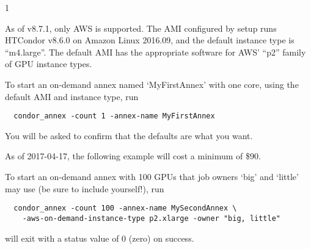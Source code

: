 \begin{ManPage}{\label{man-condor-annex}}{1}
\GenRem

As of v8.7.1, only AWS is supported.  The AMI configured by setup runs
HTCondor v8.6.0 on Amazon Linux 2016.09, and the default instance type
is ``m4.large''.  The default AMI has the appropriate software for AWS'
``p2'' family of GPU instance types.

\Examples

To start an on-demand annex named `MyFirstAnnex' with one core,
using the default AMI and instance type, run

\begin{verbatim}
  condor_annex -count 1 -annex-name MyFirstAnnex
\end{verbatim}

You will be asked to confirm that the defaults are what you want.

As of 2017-04-17, the following example will cost a minimum of \$90.

To start an on-demand annex with 100 GPUs that job owners `big' and `little'
may use (be sure to include yourself!), run

\begin{verbatim}
  condor_annex -count 100 -annex-name MySecondAnnex \
    -aws-on-demand-instance-type p2.xlarge -owner "big, little"
\end{verbatim}

\ExitStatus

 will exit with a status value of 0 (zero) on success.

\end{ManPage}
